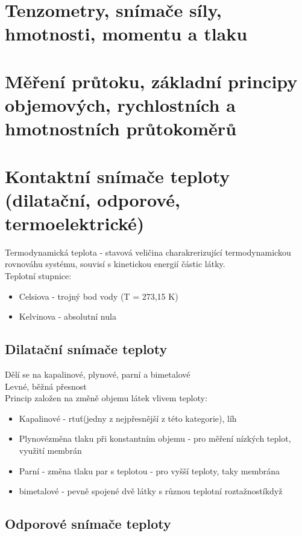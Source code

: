 \section{Tenzometry, snímače síly, hmotnosti, momentu a tlaku }


\section{Měření průtoku, základní principy objemových, rychlostních a hmotnostních průtokoměrů}

\newpage

\section{Kontaktní snímače teploty (dilatační, odporové, termoelektrické)}
Termodynamická teplota - stavová veličina charakrerizující termodynamickou rovnováhu systému, souvisí s kinetickou energií částic látky.\\
Teplotní stupnice:
\begin{itemize}
    \item Celsiova  - trojný bod vody (T = 273,15 K)
    \item Kelvinova - absolutní nula 
\end{itemize}
\subsection*{Dilatační snímače teploty}

Dělí se na kapalinové, plynové, parní a bimetalové\\
Levné, běžná přesnost\\
Princip založen na změně objemu látek vlivem teploty:
\begin{itemize}
    \item Kapalinové - rtuť(jedny z nejpřesnější z této kategorie), líh 
    \item Plynovézměna tlaku při konstantním objemu - pro měření nízkých teplot, využití membrán 
    \item Parní - změna tlaku par s teplotou - pro vyšší teploty, taky membrána 
    \item bimetalové - pevně spojené dvě látky s různou teplotní roztažnostíkdyž 
\end{itemize}

\subsection*{Odporové snímače teploty}
